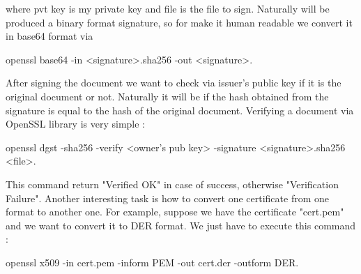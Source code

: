 \documentclass[11pt]{article}
\begin{document}
where pvt key is my private key and file is the file to sign. Naturally will be produced a binary format signature, so for make it human readable we convert it in base64 format via 
\begin{center}
openssl base64 -in <signature>.sha256 -out <signature>.
\end{center}
After signing the document we want to check via issuer's public key if it is the original document or not. Naturally it will be if the hash obtained from the signature is equal to the hash of the original document. Verifying a document via OpenSSL library is very simple :
\begin{center}
openssl dgst -sha256 -verify <owner's pub key> -signature <signature>.sha256 <file>.
\end{center}
This command return "Verified OK" in case of success, otherwise "Verification Failure". Another interesting task is how to convert one certificate from one format to another one. For example, suppose we have the certificate "cert.pem" and we want to convert it to DER format. We just have to execute this command :
\begin{center}
openssl x509 -in cert.pem -inform PEM -out cert.der -outform DER.
\end{center}
\end{document}
